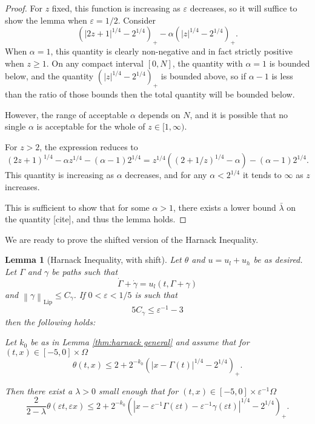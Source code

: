 \documentclass[11pt]{amsart}
\newtheorem{lemma}[theorem]{Lemma}
\theoremstyle{remark}
\theoremstyle{definition}
\newcommand{\eps}{\varepsilon}
\newcommand{\norm}[1]{\left\lVert#1\right\rVert}
\newcommand{\paren}[1]{\left( #1 \right)}
\newcommand{\Lip}{\text{Lip}}
\newcommand{\n}{^{-1}}
\newcommand{\ulow}{u_l}
\newcommand{\uhigh}{u_h}
\begin{document}
\begin{proof}
For $z$ fixed, this function is increasing as $\eps$ decreases, so it will suffice to show the lemma when $\eps = 1/2$.  Consider
\[ \paren{|2 z + 1|^{1/4} - 2^{1/4}}_+ - \alpha \paren{|z|^{1/4} - 2^{1/4}}_+. \]
When $\alpha = 1$, this quantity is clearly non-negative and in fact strictly positive when $z \geq 1$.  On any compact interval $[0,N]$, the quantity with $\alpha = 1$ is bounded below, and the quantity $\paren{|z|^{1/4} - 2^{1/4}}_+$ is bounded above, so if $\alpha-1$ is less than the ratio of those bounds then the total quantity will be bounded below.  

However, the range of acceptable $\alpha$ depends on $N$, and it is possible that no single $\alpha$ is acceptable for the whole of $z \in [1,\infty)$.  

For $z > 2$, the expression reduces to
\[ (2z+1)^{1/4} - \alpha z^{1/4} - (\alpha-1) 2^{1/4} = z^{1/4} \paren{(2 + 1/z)^{1/4} - \alpha} - (\alpha-1)2^{1/4}. \]
This quantity is increasing as $\alpha$ decreases, and for any $\alpha < 2^{1/4}$ it tends to $\infty$ as $z$ increases. 

This is sufficient to show that for some $\alpha > 1$, there exists a lower bound $\bar{\lambda}$ on the quantity [cite], and thus the lemma holds. 
\end{proof}

We are ready to prove the shifted version of the Harnack Inequality.  

\begin{lemma}[Harnack Inequality, with shift] \label{thm:harnack shifted}
Let $\theta$ and $u = \ulow + \uhigh$ be as desired.  Let $\Gamma$ and $\gamma$ be paths such that
\[ \dot{\Gamma} + \dot{\gamma} = \ulow(t,\Gamma+\gamma) \]
and $\norm{\gamma}_\Lip \leq C_\gamma$.  If $0 < \eps < 1/5$ is such that
\[ 5 C_\gamma \leq \eps\n - 3 \]
then the following holds:

Let $k_0$ be as in Lemma \ref{thm:harnack general} and assume that for $(t,x) \in [-5,0]\times \Omega$
\[ \theta(t,x) \leq 2 + 2^{-k_0} \paren{|x-\Gamma(t)|^{1/4}-2^{1/4}}_+. \]

Then there exist a $\lambda > 0$ small enough that for $(t,x) \in [-5,0]\times \eps\n \Omega$
\[ \frac{2}{2-\lambda} \theta(\eps t, \eps x) \leq 2 + 2^{-k_0} \paren{|x-\eps\n\Gamma(\eps t)-\eps\n\gamma(\eps t)|^{1/4}-2^{1/4}}_+. \]
\end{lemma}
\end{document}
